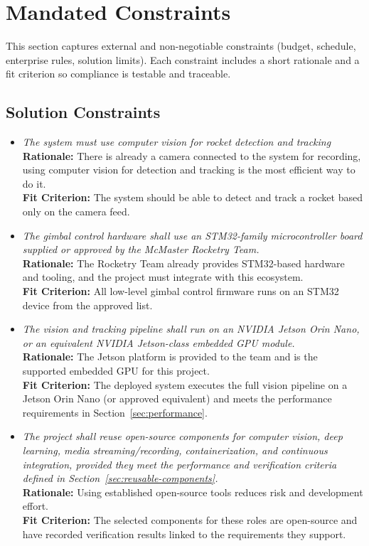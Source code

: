 \documentclass[12pt]{article}
\begin{document}
\section{Mandated Constraints}
This section captures external and non-negotiable constraints (budget,
schedule, enterprise rules, solution limits). Each constraint includes a short
rationale and a fit criterion so compliance is testable and traceable.
\subsection{Solution Constraints}

\begin{itemize}[leftmargin=*]
  \item[SC-1] \emph{The system must use computer vision for rocket detection and
          tracking}\\[2mm]
        \textbf{Rationale:} There is already a camera connected to the system for recording, using computer vision for detection and tracking is the most efficient way to do it. \\
        \textbf{Fit Criterion:} The system should be able to detect and track a rocket based only on the camera feed.

  \item[SC-2] \emph{The gimbal control hardware shall use an STM32-family
          microcontroller board supplied or approved by the McMaster Rocketry Team.}\\[2mm]
        \textbf{Rationale:} The Rocketry Team already provides STM32-based hardware and tooling, and the project must integrate with this ecosystem.\\
        \textbf{Fit Criterion:} All low-level gimbal control firmware runs on an STM32 device from the approved list.

  \item[SC-3] \emph{The vision and tracking pipeline shall run on an NVIDIA Jetson Orin
          Nano, or an equivalent NVIDIA Jetson-class embedded GPU module.}\\[2mm]
        \textbf{Rationale:} The Jetson platform is provided to the team and is the supported embedded GPU for this project.\\
        \textbf{Fit Criterion:} The deployed system executes the full vision pipeline on a Jetson Orin Nano (or approved equivalent) and meets the performance requirements in Section~\ref{sec:performance}.

  \item[SC-4] \emph{The project shall reuse open-source components for computer vision,
          deep learning, media streaming/recording, containerization, and continuous
          integration, provided they meet the performance and verification criteria
          defined in Section~\ref{sec:reusable-components}.}\\[2mm]
        \textbf{Rationale:} Using established open-source tools reduces risk and development effort.\\
        \textbf{Fit Criterion:} The selected components for these roles are open-source and have recorded verification results linked to the requirements they support.
\end{itemize}
\end{document}
